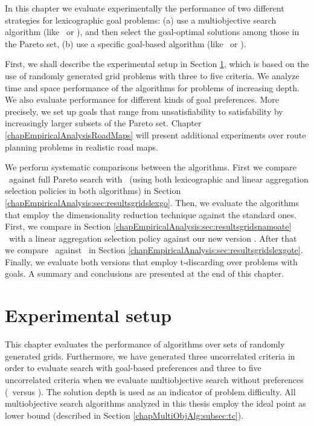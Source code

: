 In this chapter we evaluate experimentally the performance of two different strategies for lexicographic goal problems: (a) use a multiobjective search algorithm (like \namoa \ or \namoate), and then select the goal-optimal solutions among those in the Pareto set, (b) use a specific goal-based algorithm (like \lexgo \ or \lexgote).

First, we shall describe the experimental setup in Section \ref{chapEmpiricalAnalysis:sec:grids}, which is based on the use of randomly generated grid problems with three to five criteria. We analyze time and space performance of the algorithms for problems of increasing depth. We also evaluate performance for different kinds of goal preferences. More precisely, we set up goals that range from unsatisfiability to satisfability by increasingly larger subsets of the Pareto set. Chapter \ref{chapEmpiricalAnalysisRoadMaps} will present additional experiments over route planning problems in realistic road maps.

We perform systematic comparisons between the algorithms. First we compare \lexgo \ against full Pareto search with \namoa \ (using both lexicographic and linear aggregation selection policies in both algorithms) in Section \ref{chapEmpiricalAnalysis:sec:resultsgridslexgo}. Then, we evaluate the algorithms that employ the dimensionality reduction technique against the standard ones. First, we compare in Section \ref{chapEmpiricalAnalysis:sec:resultsgridsnamoate} \namoa \ with a linear aggregation selection policy against our new version \namoate. After that we compare \lexgote \ against \lexgo \ in Section \ref{chapEmpiricalAnalysis:sec:resultsgridslexgote}. Finally, we evaluate both versions that employ t-discarding over problems with goals. A summary and conclusions are presented at the end of this chapter.

\section{Experimental setup}
\label{chapEmpiricalAnalysis:sec:grids}

This chapter evaluates the performance of algorithms over sets of randomly generated grids. Furthermore, we have generated three uncorrelated criteria in order to evaluate search with goal-based preferences and three to five uncorrelated criteria when we evaluate multiobjective search without preferences (\namoa \ versus \namoate). The solution depth is used as an indicator of problem difficulty. All multiobjective search algorithms analyzed in this thesis employ the ideal point as lower bound (described in Section \ref{chapMultiObjAlg:subsec:tc}). 

